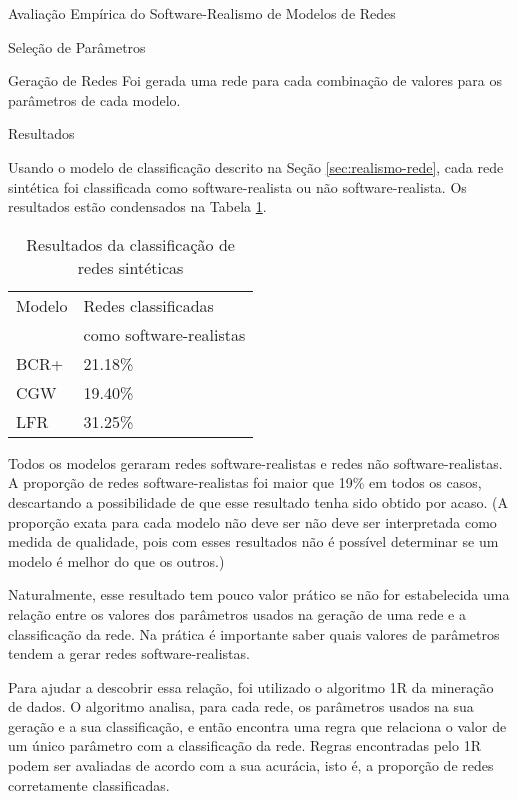 \begin{section}{Avaliação Empírica do Software-Realismo de Modelos de Redes}
\begin{subsection}{Seleção de Parâmetros}
\end{subsection}

\begin{section}{Geração de Redes}
	Foi gerada uma rede para cada combinação de valores para os parâmetros de cada modelo.
\end{section}

\begin{subsection}{Resultados}

Usando o modelo de classificação descrito na Seção \ref{sec:realismo-rede}, cada rede sintética foi classificada como software-realista ou não software-realista. Os resultados estão condensados na Tabela \ref{tab:results}.

\begin{table}
\caption{Resultados da classificação de redes sintéticas}
\centering
\begin{tabular}{|l|l|}
\hline
Modelo & Redes classificadas \\ & como software-realistas \\
\hline 
\hline
BCR+ & 21.18\% \\ %
\hline
CGW  & 19.40\% \\  %
\hline
LFR  & 31.25\% \\ %
\hline
\end{tabular}
\label{tab:results}
\end{table}

Todos os modelos geraram redes software-realistas e redes não software-realistas. A proporção de redes software-realistas foi maior que 19\% em todos os casos, descartando a possibilidade de que esse resultado tenha sido obtido por acaso. (A proporção exata para cada modelo não deve ser não deve ser interpretada como medida de qualidade, pois com esses resultados não é possível determinar se um modelo é melhor do que os outros.)

Naturalmente, esse resultado tem pouco valor prático se não for estabelecida uma relação entre os valores dos parâmetros usados na geração de uma rede e a classificação da rede. Na prática é importante saber quais valores de parâmetros tendem a gerar redes software-realistas.

Para ajudar a descobrir essa relação, foi utilizado o algoritmo 1R \cite{OneR} da mineração de dados. O algoritmo analisa, para cada rede, os parâmetros usados na sua geração e a sua classificação, e então encontra uma regra que relaciona o valor de um único parâmetro com a classificação da rede. Regras encontradas pelo 1R podem ser avaliadas de acordo com a sua acurácia, isto é, a proporção de redes corretamente classificadas.


\end{subsection}
\end{section}
